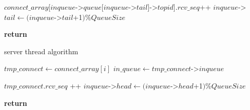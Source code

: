 {\begin{algorithm}
\begin{algorithmic}[1]
                \State
                    \State {}
                \Else
                    \State {} 
                    \State {}

                    \State
                    \State $connect\_array[inqueue$->$queue[inqueue$->$tail]$->$topid].rcv\_seq $++
                    \State $inqueue$->$tail \gets (inqueue$->$tail$+1$) \% QueueSize$
                \EndIf
            \EndWhile
            
            \State
            \State {}
            \State \textbf{return}
        \EndFunction
    \end{algorithmic}
\end{algorithm}

\begin{algorithm}
    \caption{server thread algorithm}
    \begin{algorithmic}[1] %
            \State {}

                    \State $tmp\_connect \gets connect\_array[i]$
                    \State $in\_queue \gets tmp\_connect$->$inqueue$

                    \State
                        \State {}
                        \State {} 
                        \State {}

                        \State
                            \State $tmp\_connect.rcv\_seq$ ++
                        \EndIf
                        \State $inqueue$->$head \gets (inqueue$->$head$+1$) \% QueueSize$
                    \EndIf
                \EndFor

                \State
                    \State {}
                \EndIf
            \EndWhile
            \State \textbf{return}
         \EndProcedure
    \end{algorithmic}
\end{algorithm}

}
